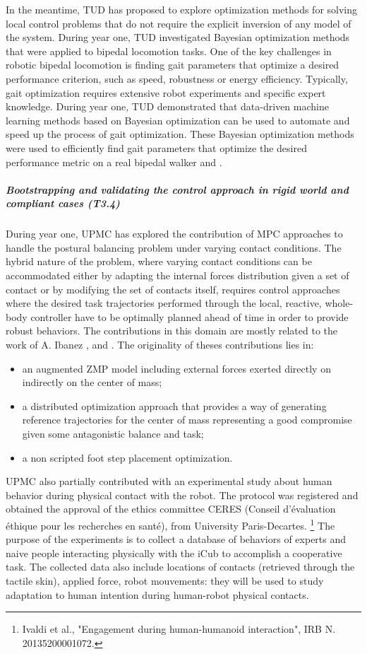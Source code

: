 \documentclass[12pt,a4paper,twoside]{article}
\begin{document}
In the meantime, TUD has proposed to explore optimization methods for solving local control problems that do not require the explicit inversion of any model of the system.  During year one, TUD investigated Bayesian optimization methods that were applied to bipedal locomotion tasks.  One of the key challenges in robotic bipedal locomotion is finding gait parameters that optimize a desired performance criterion, such as speed, robustness or energy efficiency. Typically, gait optimization requires extensive robot experiments and specific expert knowledge. During year one, TUD demonstrated that  data-driven machine learning methods based on Bayesian optimization can be used to automate and speed up the process of gait optimization. These Bayesian optimization methods were used to efficiently find gait parameters that optimize the desired performance metric on a real bipedal walker \cite{calandra2014} and \cite{calandra2014b}.
    

\subparagraph{Bootstrapping and validating the control approach in rigid world and compliant cases (T3.4)}

During year one, UPMC has explored the contribution of MPC approaches to handle the postural balancing problem under varying contact conditions. The hybrid nature of the problem, where varying contact conditions can be accommodated either by adapting the internal forces distribution given a set of contact or by modifying the set of contacts itself, requires control approaches where the desired task trajectories performed through the local, reactive, whole-body controller have to be optimally planned ahead of time in order to provide robust behaviors. The contributions in this domain are mostly related to the work of A. Ibanez \cite{ibanez2013}, \cite{ibanez2014-icra} and \cite{ibanez2014-ark}. The originality of theses contributions lies in:
\begin{itemize}
	\item an augmented ZMP model including external forces exerted directly on indirectly on the center of mass;
	\item a distributed optimization approach that provides a way of generating reference trajectories for the center of mass representing a good compromise given some antagonistic balance and task;
	\item a non scripted foot step placement optimization.
\end{itemize}

UPMC also partially contributed with an experimental study about human behavior during physical contact with the robot. The protocol was registered and obtained the approval of the ethics committee CERES (Conseil d’\'evaluation \'ethique pour les recherches en sant\'e), from University Paris-Decartes. \footnote{Ivaldi et al., "Engagement during human-humanoid interaction", IRB N. 20135200001072.}
The purpose of the experiments is to collect a database of behaviors of experts and naive people interacting physically with the iCub to accomplish a cooperative task. The collected data also include locations of contacts (retrieved through the tactile skin), applied force, robot mouvements: they will be used to study adaptation to human intention during human-robot physical contacts.
    
\end{document}
